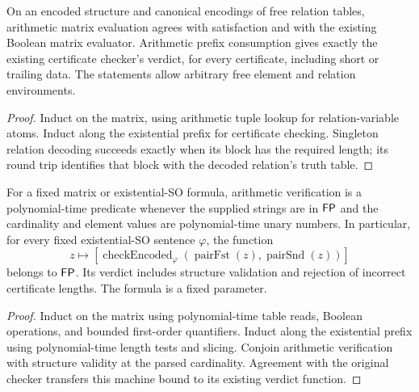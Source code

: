 \begin{theorem}
  \label{thm:desc-so-verifier-code}
  \leanok
  On an encoded structure and canonical encodings of free relation tables,
  arithmetic matrix evaluation agrees with satisfaction and with the existing
  Boolean matrix evaluator. Arithmetic prefix consumption gives exactly the
  existing certificate checker's verdict, for every certificate, including
  short or trailing data. The statements allow arbitrary free element and
  relation environments.
\end{theorem}
\begin{proof}
  \leanok
  Induct on the matrix, using arithmetic tuple lookup for relation-variable
  atoms. Induct along the existential prefix for certificate checking. Singleton
  relation decoding succeeds exactly when its block has the required length;
  its round trip identifies that block with the decoded relation's truth table.
\end{proof}

\begin{theorem}
  \label{thm:desc-so-verifier-polytime}
  \leanok
  For a fixed matrix or existential-SO formula, arithmetic verification is a
  polynomial-time predicate whenever the supplied strings are in $\mathsf{FP}$
  and the cardinality and element values are polynomial-time unary numbers.
  In particular, for every fixed existential-SO sentence $\varphi$, the function
  \[
    z\longmapsto[\operatorname{checkEncoded}_{\varphi}
      (\operatorname{pairFst}(z),\operatorname{pairSnd}(z))]
  \]
  belongs to $\mathsf{FP}$. Its verdict includes structure validation and rejection
  of incorrect certificate lengths. The formula is a fixed parameter.
\end{theorem}
\begin{proof}
  \leanok
  Induct on the matrix using polynomial-time table reads, Boolean operations,
  and bounded first-order quantifiers. Induct along the existential prefix using
  polynomial-time length tests and slicing. Conjoin arithmetic verification with
  structure validity at the parsed cardinality. Agreement with the original
  checker transfers this machine bound to its existing verdict function.
\end{proof}

